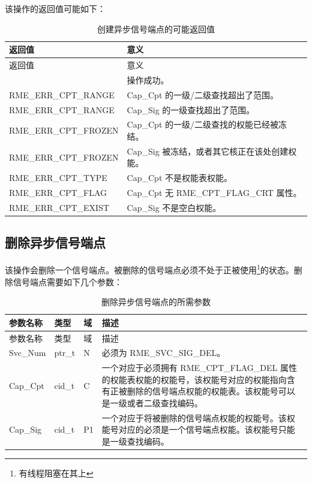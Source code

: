 该操作的返回值可能如下：

\begin{xltabular}{\textwidth}{@{}>{\hsize\raggedright\arraybackslash}X>{\hsize\raggedright\arraybackslash}X@{}}
\caption{创建异步信号端点的可能返回值}\label{tab:5-17-create-signal-endpoint-return-values}\\
\toprule
返回值 & 意义\tabularnewline
\endfirsthead
\toprule
返回值 & 意义\tabularnewline
\midrule
\endhead
\bottomrule
{} & 操作成功。\tabularnewline
    RME\_ERR\_CPT\_RANGE & Cap\_Cpt 的一级/二级查找超出了范围。\tabularnewline
    RME\_ERR\_CPT\_RANGE & Cap\_Sig 的一级查找超出了范围。\tabularnewline
    RME\_ERR\_CPT\_FROZEN & Cap\_Cpt 的一级/二级查找的权能已经被冻结。\tabularnewline
    RME\_ERR\_CPT\_FROZEN & Cap\_Sig 被冻结，或者其它核正在该处创建权能。\tabularnewline
    RME\_ERR\_CPT\_TYPE & Cap\_Cpt 不是权能表权能。\tabularnewline
    RME\_ERR\_CPT\_FLAG & Cap\_Cpt 无 RME\_CPT\_FLAG\_CRT 属性。\tabularnewline
    RME\_ERR\_CPT\_EXIST & Cap\_Sig 不是空白权能。\tabularnewline
\end{xltabular}

\subsection{删除异步信号端点}\label{subsec:5-delete-async-signal-endpoint}

该操作会删除一个信号端点。被删除的信号端点必须不处于正被使用\footnote{有线程阻塞在其上}的状态。删除信号端点需要如下几个参数：

\begin{xltabular}{\textwidth}{@{}>{\hsize\raggedright\arraybackslash}X>{\hsize\raggedright\arraybackslash}X>{\hsize\raggedright\arraybackslash}X>{\hsize\raggedright\arraybackslash}X@{}}
\caption{删除异步信号端点的所需参数}\label{tab:5-18-delete-signal-endpoint-parameters}\\
\toprule
参数名称 & 类型 & 域 & 描述\tabularnewline
\endfirsthead
\toprule
参数名称 & 类型 & 域 & 描述\tabularnewline
\midrule
\endhead
\bottomrule
\endlastfoot
Svc\_Num & ptr\_t & N & 必须为 RME\_SVC\_SIG\_DEL。\tabularnewline
Cap\_Cpt & cid\_t & C &
一个对应于必须拥有 RME\_CPT\_FLAG\_DEL 属性的权能表权能的权能号，该权能号对应的权能指向含有正被删除的信号端点权能的权能表。该权能号可以是一级或者二级查找编码。\tabularnewline
Cap\_Sig & cid\_t & P1 &
一个对应于将被删除的信号端点权能的权能号。该权能号对应的必须是一个信号端点权能。该权能号只能是一级查找编码。\tabularnewline
\end{xltabular}

